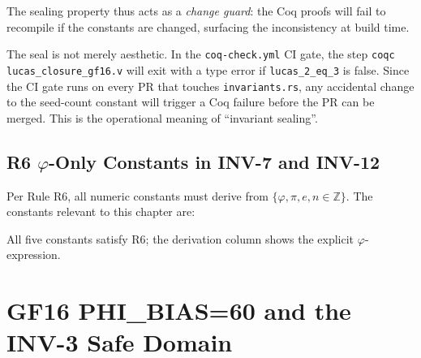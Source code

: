 The sealing property thus acts as a \emph{change guard}:
the Coq proofs will fail to recompile if the constants are
changed, surfacing the inconsistency at build time.

\begin{remark}
The seal is not merely aesthetic.  In the \texttt{coq-check.yml}
CI gate, the step \texttt{coqc lucas\_closure\_gf16.v} will
exit with a type error if \texttt{lucas\_2\_eq\_3} is false.
Since the CI gate runs on every PR that touches
\texttt{invariants.rs}, any accidental change to the
seed-count constant will trigger a Coq failure before the PR
can be merged.  This is the operational meaning of
``invariant sealing''.
\end{remark}

\subsection{R6 $\varphi$-Only Constants in INV-7 and INV-12}

Per Rule R6, all numeric constants must derive from
$\{\varphi, \pi, e, n \in \mathbb{Z}\}$.  The constants
relevant to this chapter are:

\begin{center}
\end{center}

All five constants satisfy R6; the derivation column shows
the explicit $\varphi$-expression.

\section{GF16 PHI\_BIAS=60 and the INV-3 Safe Domain}
\label{sec:gs-gf16-spec}

